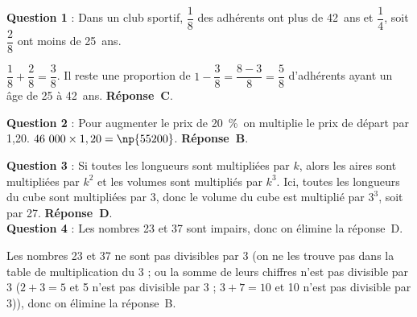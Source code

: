 \documentclass[10pt]{article}
\begin{document}
\setlength\parindent{0mm}
\pagestyle{fancy}
\thispagestyle{empty}
    
    
    




\medskip

\textbf{Question 1} : Dans un club sportif, $\dfrac{1}{8}$ des adhérents ont plus de 42~ans et $\dfrac{1}{4}$, soit $\dfrac{2}{8}$ ont moins de 25~ans.

$\dfrac{1}{8}+\dfrac{2}{8}=\dfrac{3}{8}$. Il reste une proportion de $1 - \dfrac{3}{8} = \dfrac{8 - 3}{8} = \dfrac{5}{8}$ d'adhérents ayant un âge de 25 à  42~ans. \textbf{Réponse~C}.

\textbf{Question 2} : Pour augmenter le prix de 20~\%\, on multiplie le prix de départ par 1,20. $46~000\times 1,20=\np{55200}$. \textbf{Réponse~B}.

\textbf{Question 3} : Si toutes les longueurs sont multipliées par $k$, alors les aires sont multipliées par $k^2$ et les volumes sont multipliés par $k^3$. Ici, toutes les longueurs du cube sont multipliées par 3, donc le volume du cube est multiplié par $3^3$, soit par 27.  \textbf{Réponse~D}. \\[2mm]
\textbf{Question 4} : Les nombres 23 et 37 sont impairs, donc on élimine la réponse~D.

Les nombres 23 et 37 ne sont pas divisibles par 3 (on ne les trouve pas dans la table de multiplication du 3 ; ou la somme de leurs chiffres n’est pas divisible par 3 ($2+3=5$ et 5 n’est pas divisible par 3 ; $3+7 = 10$ et 10 n’est pas divisible par 3)), donc on élimine la réponse~B.
\end{document}

